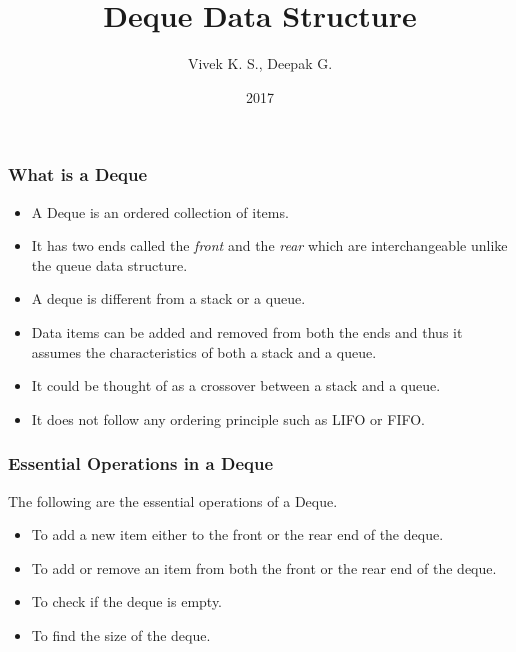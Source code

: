 \documentclass{beamer}
\title{Deque Data Structure}
\author{Vivek K. S., Deepak G.}
\institute{Information Systems Decision Sciences (ISDS)\\
MUMA College of Business\\
University of South Florida \\
Tampa, Florida}
\date{2017}
\begin{document}
 
\frame{\titlepage}
 
\begin{frame}
\frametitle{What is a Deque}
\begin{itemize}

\item A Deque is an ordered collection of items.

\item It has two ends called the \textit{front} and the \textit{rear} which are interchangeable unlike the queue data structure.

\item A deque is different from a stack or a queue.

\item Data items can be added and removed from both the ends and thus it assumes the characteristics of both a stack and a queue. 

\item It could be thought of as a crossover between a stack and a queue.

\item It does not follow any ordering principle such as LIFO or FIFO.


\end{itemize}
\end{frame}


\begin{frame}
\frametitle{Essential Operations in a Deque}
The following are the essential operations of a Deque.
\begin{itemize}

\item To add a new item either to the front or the rear end of the deque.

\item To add or remove an item from both the front or the rear end of the deque.

\item To check if the deque is empty.

\item To find the size of the deque.

\end{itemize}
\end{frame}
\end{document}
